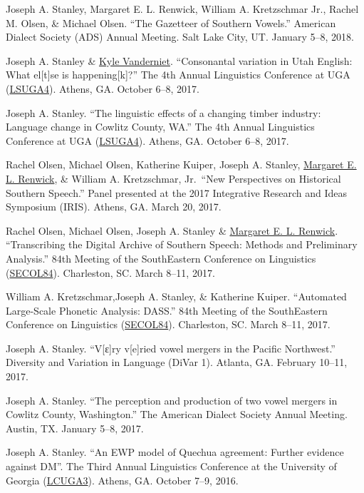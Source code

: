 \documentclass[
]{article}
\begin{document}
{Joseph A. Stanley}, Margaret E. L. Renwick, William A. Kretzschmar Jr.,
Rachel M. Olsen, \& Michael Olsen. ``The Gazetteer of Southern Vowels.''
American Dialect Society (ADS) Annual Meeting. Salt Lake City, UT.
January 5--8, 2018.

{Joseph A. Stanley} \& \href{https://clyguy.wixsite.com/profile}{Kyle
Vanderniet}. ``Consonantal variation in Utah English: What el{[}t{]}se
is happening{[}k{]}?'' The 4th Annual Linguistics Conference at UGA
(\href{http://www.linguistics.uga.edu/lcuga-4}{LSUGA4}). Athens, GA.
October 6--8, 2017.

{Joseph A. Stanley}. ``The linguistic effects of a changing timber
industry: Language change in Cowlitz County, WA.'' The 4th Annual
Linguistics Conference at UGA
(\href{http://www.linguistics.uga.edu/lcuga-4}{LSUGA4}). Athens, GA.
October 6--8, 2017.

Rachel Olsen, Michael Olsen, Katherine Kuiper, {Joseph A. Stanley},
\href{http://faculty.franklin.uga.edu/mrenwick/}{Margaret E. L.
Renwick}, \& William A. Kretzschmar, Jr.~``New Perspectives on
Historical Southern Speech.'' Panel presented at the 2017 Integrative
Research and Ideas Symposium (IRIS). Athens, GA. March 20, 2017.

Rachel Olsen, Michael Olsen, {Joseph A. Stanley} \&
\href{http://faculty.franklin.uga.edu/mrenwick/}{Margaret E. L.
Renwick}. ``Transcribing the Digital Archive of Southern Speech: Methods
and Preliminary Analysis.'' 84th Meeting of the SouthEastern Conference
on Linguistics (\href{http://conf2017.secol.org}{SECOL84}). Charleston,
SC. March 8--11, 2017.

William A. Kretzschmar,{Joseph A. Stanley}, \& Katherine Kuiper.
``Automated Large-Scale Phonetic Analysis: DASS.'' 84th Meeting of the
SouthEastern Conference on Linguistics
(\href{http://conf2017.secol.org}{SECOL84}). Charleston, SC. March
8--11, 2017.

{Joseph A. Stanley}. ``V{[}ɛ{]}ry v{[}e{]}ried vowel mergers in the
Pacific Northwest.'' Diversity and Variation in Language (DiVar 1).
Atlanta, GA. February 10--11, 2017.

{Joseph A. Stanley}. ``The perception and production of two vowel
mergers in Cowlitz County, Washington.'' The American Dialect Society
Annual Meeting. Austin, TX. January 5--8, 2017.

{Joseph A. Stanley}. ``An EWP model of Quechua agreement: Further
evidence against DM''. The Third Annual Linguistics Conference at the
University of Georgia
(\href{https://www.linguistics.uga.edu/lcuga-3}{LCUGA3}). Athens, GA.
October 7--9, 2016.
\end{document}
